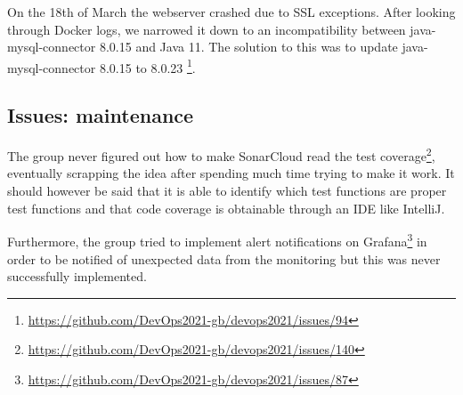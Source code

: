 On the 18th of March the webserver crashed due to SSL exceptions. After looking through Docker logs, we narrowed it down to an incompatibility between java-mysql-connector 8.0.15 and Java 11. The solution to this was to update java-mysql-connector 8.0.15 to 8.0.23 \footnote{\url{https://github.com/DevOps2021-gb/devops2021/issues/94}}.

\subsection{Issues: maintenance}
\label{issues-maintenance}
The group never figured out how to make SonarCloud read the test coverage\footnote{\url{https://github.com/DevOps2021-gb/devops2021/issues/140}}, eventually scrapping the idea after spending much time trying to make it work. It should however be said that it is able to identify which test functions are proper test functions and that code coverage is obtainable through an IDE like IntelliJ.

Furthermore, the group tried to implement alert notifications on Grafana\footnote{\url{https://github.com/DevOps2021-gb/devops2021/issues/87}} in order to be notified of unexpected data from the monitoring but this was never successfully implemented.